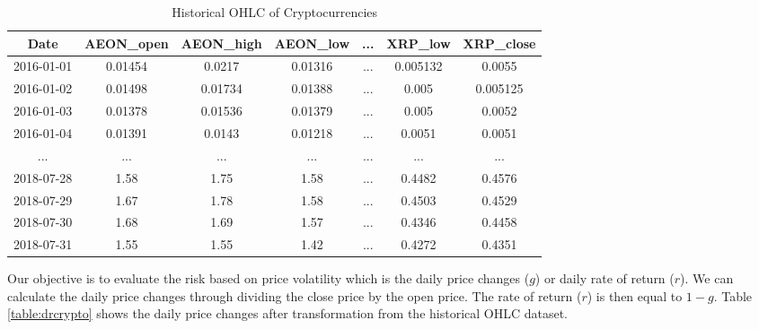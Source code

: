 \documentclass[11pt]{article} %
\theoremstyle{plain}
\theoremstyle{definition}
\begin{document}
{
  \begin{table}[ht]
    \centering
    \scriptsize
    \begin{tabular}{|c|c c c c c c|}
      \hline
      Date & AEON\_open & AEON\_high & AEON\_low & ... & XRP\_low & XRP\_close \\ [0.5ex]
      \hline
      2016-01-01 & 0.01454 & 0.0217 & 0.01316 & ... & 0.005132 & 0.0055 \\
      \hline
      2016-01-02 & 0.01498 & 0.01734 & 0.01388 & ... & 0.005 & 0.005125 \\
      \hline
      2016-01-03 & 0.01378 & 0.01536 & 0.01379 & ... & 0.005 & 0.0052 \\
      \hline
      2016-01-04 & 0.01391 & 0.0143 & 0.01218 & ... & 0.0051 & 0.0051 \\
      \hline
      ... & ... & ... & ... & ... & ... & ... \\
      \hline
      2018-07-28 & 1.58 & 1.75 & 1.58 & ... & 0.4482 & 0.4576 \\
      \hline
      2018-07-29 & 1.67 & 1.78 & 1.58 & ... & 0.4503 & 0.4529 \\
      \hline
      2018-07-30 & 1.68 & 1.69 & 1.57 & ... & 0.4346 & 0.4458 \\
      \hline
      2018-07-31 & 1.55 & 1.55 & 1.42 & ... & 0.4272 & 0.4351 \\
      \hline
    \end{tabular}
    \caption{Historical OHLC of Cryptocurrencies}
    \label{table:ohlccrypto}
  \end{table}
}

Our objective is to evaluate the risk based on price volatility which is the daily price changes ($g$) or daily rate of return ($r$). We can calculate the daily price changes through dividing the close price by the open price. The rate of return ($r$) is then equal to $1 - g$. Table \ref{table:drcrypto} shows the daily price changes after transformation from the historical OHLC dataset.
\end{document}
